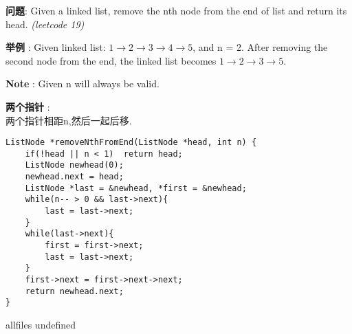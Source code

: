 \documentclass{article}
\begin{document}
\begin{CJK}{UTF8}{gbsn}     %

\else
    
\begin{description}
    \item{\textbf{问题}}: Given a linked list, remove the nth node from the end of list and return its head. \textit{(leetcode 19)}
    \item{\textbf{举例}} : Given linked list: $1\rightarrow2\rightarrow3\rightarrow4\rightarrow5$, and n = 2. After removing the second node from the end, the linked list becomes $1\rightarrow2\rightarrow3\rightarrow5$.
    \item{\textbf{Note}} : Given n will always be valid.
    \item{\textbf{两个指针}} : 
    \\两个指针相距n,然后一起后移.
    \begin{lstlisting}
ListNode *removeNthFromEnd(ListNode *head, int n) {
	if(!head || n < 1)	return head;
	ListNode newhead(0);
	newhead.next = head;
	ListNode *last = &newhead, *first = &newhead;
	while(n-- > 0 && last->next){
		last = last->next;
	}
	while(last->next){
		first = first->next;
		last = last->next;
	}
	first->next = first->next->next;
	return newhead.next;
}
    \end{lstlisting}
\end{description}

\fi

\ifx allfiles undefined
\end{CJK}
\end{document}
